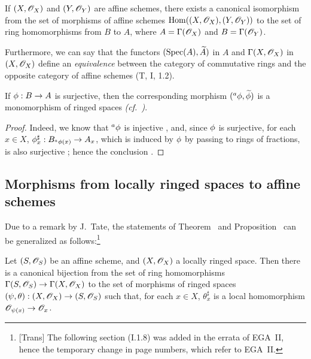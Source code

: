\begin{cor}[1.7.4]
\label{1.1.7.4}
If $(X,\mathscr{O}_X)$ and $(Y,\mathscr{O}_Y)$ are affine schemes, there exists a canonical isomorphism from the set of morphisms of affine schemes ${\mathop{\mathrm{Hom}}\nolimits}((X,\mathscr{O}_X),(Y,\mathscr{O}_Y))$ to the set of ring homomorphisms from $B$ to $A$, where $A=\Gamma(\mathscr{O}_X)$ and $B=\Gamma(\mathscr{O}_Y)$.
\end{cor}

Furthermore, we can say that the functors $({\mathop{\mathrm{Spec}}\nolimits}(A),{\widetilde{A}})$ in $A$ and $\Gamma(X,\mathscr{O}_X)$ in $(X,\mathscr{O}_X)$ define an \emph{equivalence} between the category of commutative rings and the opposite category of affine schemes (T, I, 1.2).

\begin{cor}[1.7.5]
\label{1.1.7.5}
If $\vphi:B\to A$ is surjective, then the corresponding morphism $({}^a\phi,{\widetilde{\phi}})$ is a monomorphism of ringed spaces \emph{(cf.~)}.
\end{cor}

\begin{proof}
\label{proof-1.1.7.5}
Indeed, we know that ${}^a\phi$ is injective , and, since $\phi$ is
surjective, for each $x\in X$, $\vphi_x^\sharp:B_{{}^a\vphi(x)}\to A_x$, which is induced by $\phi$ by passing to rings of fractions, is also surjective ;
hence the conclusion .
\end{proof}

\subsection{Morphisms from locally ringed spaces to affine schemes}
\label{subsection-morphisms-lrs-to-affine-schemes}

Due to a remark by J.~Tate, the statements of Theorem~ and Proposition~ can be generalized as follows:\footnote{[Trans] The following section (I.1.8) was added in the errata of EGA~II, hence the temporary change in page numbers, which refer to EGA~II.}

\begin{prop}[1.8.1]
\label{1.1.8.1}
Let $(S,\mathscr{O}_S)$ be an affine scheme, and $(X,\mathscr{O}_X)$ a locally ringed space.
Then there is a canonical bijection from the set of ring homomorphisms
$\Gamma(S,\OO_S)\to\Gamma(X,\OO_X)$ to the set of morphisms of ringed spaces $(\psi,\theta):(X,\OO_X)\to(S,\OO_S)$ such that, for each $x\in X$, $\theta_x^\sharp$ is a local homomorphism $\OO_{\psi(x)}\to\OO_x$.
\end{prop}


